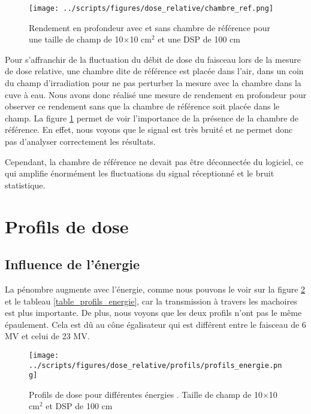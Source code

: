 \documentclass{book}
\begin{document}
\begin{figure}[h!]
  \centering
  \texttt{[image: ../scripts/figures/dose\_relative/chambre\_ref.png]}
  \caption{Rendement en profondeur avec et sans chambre de référence pour une taille de champ de 10$\times$10 cm$^2$ et une DSP de 100 cm}
  \label{fig_sanss_chambre_ref}
\end{figure}

Pour s'affranchir de la fluctuation du débit de dose du faisceau lors de la mesure de dose relative, une chambre dite de référence est placée dans l'air, dans un coin du champ d'irradiation pour ne pas perturber la mesure avec la chambre dans la cuve à eau. Nous avons donc réalisé une mesure de rendement en profondeur pour observer ce rendement sans que la chambre de référence soit placée dans le champ. La figure \ref*{fig_sanss_chambre_ref} permet de voir l'importance de la présence de la chambre de référence. En effet, nous voyons que le signal est très bruité et ne permet donc pas d'analyser correctement les résultats.

Cependant, la chambre de référence ne devait pas être déconnectée du logiciel, ce qui amplifie énormément les fluctuations du signal réceptionné et le bruit statistique.

\section{Profils de dose}
\subsection{Influence de l'énergie}

La pénombre augmente avec l'énergie, comme nous pouvons le voir sur la figure \ref*{fig_profils_energie} et le tableau \ref*{table_profils_energie}, car la transmission à travers les machoires est plus importante. De plus, nous voyons que les deux profils n'ont pas le même épaulement. Cela est dû au cône égalisateur qui est différent entre le faisceau de 6 MV et celui de 23 MV.

\begin{figure}[h]
  \centering
  \texttt{[image: ../scripts/figures/dose\_relative/profils/profils\_energie.png]}
  \caption{Profils de dose pour différentes énergies 
  . Taille de champ de 10$\times$10 cm$^2$ et DSP de 100 cm}
  \label{fig_profils_energie}
\end{figure}
\end{document}
